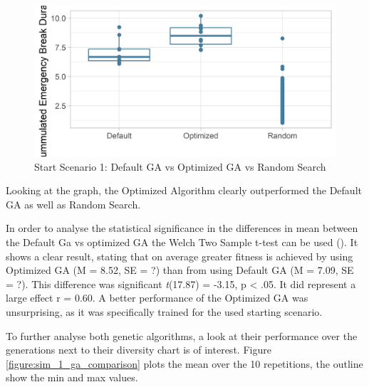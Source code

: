 \begin{figure}[ht] 
	\label{figure:sim_1_comparison}
	\includegraphics[width=1\linewidth]{simulations/evaluation/plots/sim_1_comparison}
	\caption{Start Scenario 1: Default GA vs Optimized GA vs Random Search}
\end{figure}

Looking at the graph, the Optimized Algorithm clearly outperformed the Default GA as well as Random Search.

In order to analyse the statistical significance in the differences in mean between the Default Ga vs optimized GA the Welch Two Sample t-test can be used (\cite{field_discovering_2012}). It shows a clear result, stating that on average greater fitness is achieved by using Optimized GA (M = 8.52, SE = ?) than from using Default GA (M = 7.09, SE = ?). This difference was significant \textit{t}(17.87) = -3.15, p < .05. It did represent a large effect r = 0.60.
A better performance of the Optimized GA was unsurprising, as it was specifically trained for the used starting scenario.

To further analyse both genetic algorithms, a look at their performance over the generations next to their diversity chart is of interest. Figure \ref{figure:sim_1_ga_comparison} plots the mean over the 10 repetitions, the outline show the min and max values.

